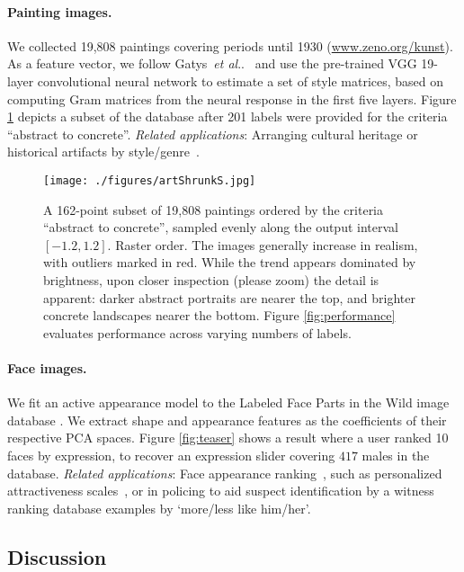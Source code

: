 \documentclass{article}
\makeatletter
\DeclareRobustCommand\onedot{\futurelet\@let@token\@onedot}
\def\@onedot{\ifx\@let@token.\else.\null\fi\xspace}
\def\etal{\emph{et al}\onedot}
\makeatother
\begin{document}
\paragraph{Painting images.} We collected 19,808 paintings covering periods until 1930 (\url{www.zeno.org/kunst}). As a feature vector, we follow Gatys~\etal~\cite{Gatys_2016_CVPR} and use the pre-trained VGG 19-layer convolutional neural network to estimate a set of style matrices, based on computing Gram matrices from the neural response in the first five layers. Figure \ref{fig:paint} depicts a subset of the database after 201 labels were provided for the criteria ``abstract to concrete''. \emph{Related applications}: Arranging cultural heritage or historical artifacts by style/genre~\cite{Cul11,WalFleCun09}.

\begin{figure}[t]
	\centering
	\texttt{[image: ./figures/artShrunkS.jpg]}
	\caption{A 162-point subset of 19,808 paintings ordered by the criteria ``abstract to concrete'', sampled evenly along the output interval $[-1.2,1.2]$. Raster order. The images generally increase in realism, with outliers marked in red. While the trend appears dominated by brightness, upon closer inspection (please zoom) the detail is apparent: darker abstract portraits are nearer the top, and brighter concrete landscapes nearer the bottom. Figure \ref{fig:performance} evaluates performance across varying numbers of labels.}
    \label{fig:paint}
\end{figure}

\paragraph{Face images.} We fit an active appearance model to the Labeled Face Parts in the Wild image database \cite{fiducials_cvpr2011,tzimiro_ICCV2013}. We extract shape and appearance features as the coefficients of their respective PCA spaces. Figure \ref{fig:teaser} shows a result where a user ranked 10 faces by expression, to recover an expression slider covering $417$ males in the database. \emph{Related applications}: Face appearance ranking~\cite{Leyvand2008}, such as personalized attractiveness scales~\cite{Eisentha2006}, or in policing to aid suspect identification by a witness ranking database examples by `more/less like him/her'.

\subsection{Discussion}
\end{document}
